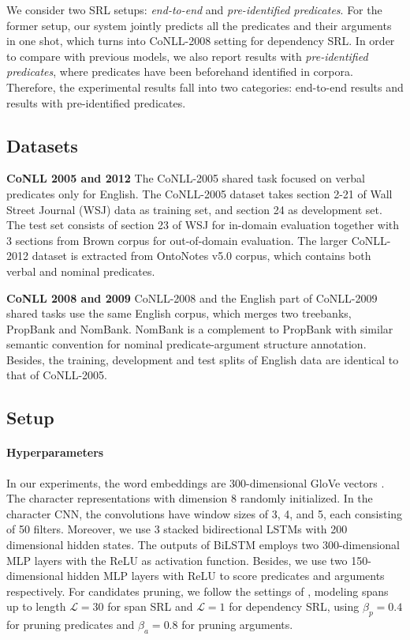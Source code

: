 \documentclass[letterpaper]{article} \usepackage{aaai19}  \usepackage{times}  \usepackage{helvet}  \usepackage{courier}  \usepackage{url}  \usepackage{graphicx}  \frenchspacing  \setlength{\pdfpagewidth}{8.5in}  \setlength{\pdfpageheight}{11in}
\begin{document}
We consider two SRL setups: \textit{end-to-end} and \textit{pre-identified predicates}. 
For the former setup, our system jointly predicts all the predicates and their arguments in one shot, which turns into CoNLL-2008 setting for dependency SRL. In order to compare with previous models, we also report results with \textit{pre-identified predicates}, where predicates have been beforehand identified in corpora. Therefore, the experimental results fall into two categories: end-to-end results and results with pre-identified predicates. 



\subsection{Datasets}


\noindent \textbf{CoNLL 2005 and 2012} \quad The CoNLL-2005 shared task focused on verbal predicates only for English.
The CoNLL-2005 dataset takes section 2-21 of Wall Street Journal (WSJ) data as training set, and section 24 as development set. The test set consists of section 23 of WSJ for in-domain evaluation together with 3 sections from Brown corpus for out-of-domain evaluation. The larger CoNLL-2012 dataset is extracted from OntoNotes v5.0 corpus, which contains both verbal and nominal predicates.



\noindent \textbf{CoNLL 2008 and 2009} \quad
CoNLL-2008 and the English part of CoNLL-2009 shared tasks use the same English corpus, 
which merges two treebanks, PropBank and NomBank. NomBank is a complement to PropBank with similar semantic convention for nominal predicate-argument structure annotation. Besides, the training, development and test splits of English data are identical to that of CoNLL-2005.





\subsection{Setup}
\paragraph{Hyperparameters}


In our experiments, the word embeddings are 300-dimensional GloVe vectors \cite{penningtonEMNLP2014}. The character representations with dimension 8 randomly initialized. In the character CNN, the convolutions  have window sizes of 3, 4, and 5, each consisting of 50 filters. Moreover, we use 3 stacked bidirectional LSTMs with 200 dimensional hidden states. The outputs of BiLSTM employs two 300-dimensional MLP layers with the ReLU as activation function.
Besides, we use two 150-dimensional hidden MLP layers with ReLU to score predicates and arguments respectively. For candidates pruning, we follow the settings of \citeauthor{he2018jointly} , modeling spans up to length $\mathcal{L}=30$ for span SRL and $\mathcal{L}=1$ for dependency SRL, using $\beta_p=0.4$ for pruning predicates and $\beta_a=0.8$ for pruning arguments.
\end{document}
